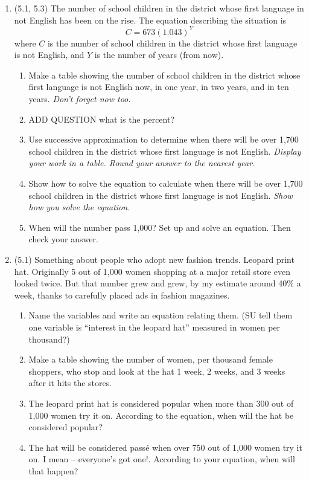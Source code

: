\documentclass[12pt]{article}
\begin{document}
\begin{enumerate}
\item (5.1, 5.3) The number of school children in the district whose first language in not English has been on the rise.  The equation describing the situation is $$C=673(1.043)^Y$$ where $C$ is the number of school children in the district whose first language is not English, and $Y$ is the number of years (from now).
\begin{enumerate}
\item Make a table showing the number of school children in the district whose first language is not English now, in one year, in two years, and in ten years. \emph{Don't forget now too.}
\item ADD QUESTION what is the percent?
\item Use successive approximation to determine when there will be over 1,700 school children in the district whose first language is not English.  \emph{Display your work in a table.  Round your answer to the nearest year.}
\item Show how to solve the equation to calculate when there will be over 1,700 school children in the district whose first language is not English. \emph{Show how you solve the equation.}  
\item When will the number pass 1,000?  Set up and solve an equation. Then check your answer.
\end{enumerate}


\item (5.1) Something about people who adopt new fashion trends. Leopard print hat. Originally 5 out of 1,000 women shopping at a major retail store even looked twice.  But that number grew and grew, by my estimate around 40\% a week, thanks to carefully placed ads in fashion magazines.
\begin{enumerate}
\item Name the variables and write an equation relating them.  (SU tell them one variable is ``interest in the leopard hat'' measured in women per thousand?)
\item Make a table showing the number of women, per thousand female shoppers, who stop and look at the hat 1 week, 2 weeks, and 3 weeks after it hits the stores.
\item The leopard print hat is considered popular when more than 300 out of 1,000 women try it on.  According to the equation, when will the hat be considered popular?
\item The hat will be considered pass\'e when over 750 out of 1,000 women try it on.  I mean -- everyone's got one!.  According to your equation, when will that happen?
\end{enumerate}


\end{enumerate}
\end{document}
